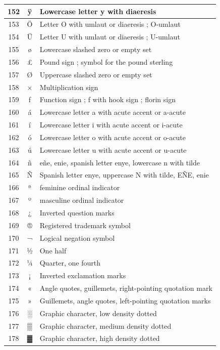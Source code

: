 {\begin{longtable}{|c|c|l|}
\hline
152 & ÿ & Lowercase letter y with diaeresis \\
\hline
153 & Ö & Letter O with umlaut or diaeresis ; O-umlaut \\
\hline
154 & Ü & Letter U with umlaut or diaeresis ; U-umlaut \\
\hline
155 & ø & Lowercase slashed zero or empty set \\
\hline
156 & £ & Pound sign ; symbol for the pound sterling \\
\hline
157 & Ø & Uppercase slashed zero or empty set \\
\hline
158 & × & Multiplication sign \\
\hline
159 & ƒ & Function sign ; f with hook sign ; florin sign \\
\hline
160 & á & Lowercase letter a with acute accent or a-acute \\
\hline
161 & í & Lowercase letter i with acute accent or i-acute \\
\hline
162 & ó & Lowercase letter o with acute accent or o-acute \\
\hline
163 & ú & Lowercase letter u with acute accent or u-acute \\
\hline
164 & ñ & eñe, enie, spanish letter enye, lowercase n with tilde \\
\hline
165 & Ñ & Spanish letter enye, uppercase N with tilde, EÑE, enie \\
\hline
166 & ª & feminine ordinal indicator \\
\hline
167 & º & masculine ordinal indicator \\
\hline
168 & ¿ & Inverted question marks \\
\hline
169 & ® & Registered trademark symbol \\
\hline
170 & ¬ & Logical negation symbol \\
\hline
171 & ½ & One half \\
\hline
172 & ¼ & Quarter, one fourth \\
\hline
173 & ¡ & Inverted exclamation marks \\
\hline
174 & « & Angle quotes, guillemets, right-pointing quotation mark \\
\hline
175 & » & Guillemets, angle quotes, left-pointing quotation marks \\
\hline
176 & ░ & Graphic character, low density dotted \\
\hline
177 & ▒ & Graphic character, medium density dotted \\
\hline
178 & ▓ & Graphic character, high density dotted \\

\end{longtable}}
